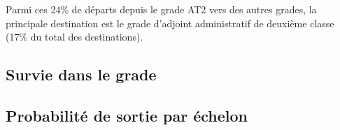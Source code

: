 \documentclass[11pt,a4paper]{article}
\begin{document}
Parmi ces 24\% de départs depuis le grade AT2 vers des autres grades, la principale destination est le grade d'adjoint administratif de deuxième classe (17\% du total des destinations). 




\subsection{Survie dans le grade}





\subsection{Probabilité de sortie par échelon}
\end{document}
